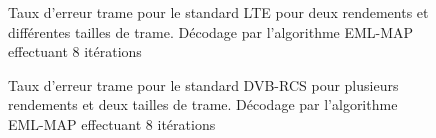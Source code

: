 % 			
% 			
																																																																																																																																								
% 			
% 			

\begin{figure}[h]
	\begin{center}
		\subfloat[LTE R=1/3]{
			
			\label{sub:lte13}
		}	   

		\subfloat[LTE R=4/5]{
			
			\label{sub:lte45}
		}
																																																																																																																																									
		\caption{Taux d'erreur trame pour le standard LTE pour deux rendements et différentes tailles de trame. Décodage par l'algorithme EML-MAP effectuant 8 itérations}
		\label{fig:ferstdlte}
	\end{center}
\end{figure}

\begin{figure}[h]
	\begin{center}
		\subfloat[DVB-RCS - K=220]{
			
			\label{sub:dvbrcs220}
		}	   

		\subfloat[DVB-RCS - K=752]{
			
			\label{sub:dvbrcs752}
		}
																																																																																																																																									
		\caption{Taux d'erreur trame pour le standard DVB-RCS pour plusieurs rendements et deux tailles de trame. Décodage par l'algorithme EML-MAP effectuant 8 itérations}
		\label{fig:ferstdDVB1}
	\end{center}
\end{figure}


